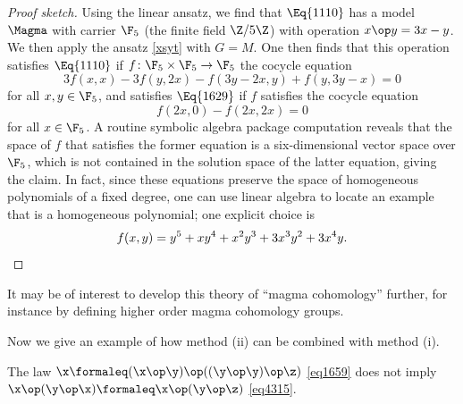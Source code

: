 \begin{proof}[Proof sketch] Using the linear ansatz, we find that $\Eq{1110}$ has a model $\Magma$ with carrier $\F_5$ (the finite field $\Z/5\Z$) with operation $x \op y = 3x-y$.  We then apply the ansatz \eqref{xsyt} with $G=M$.  One then finds that this operation satisfies $\Eq{1110}$ if $f \colon \F_5 \times \F_5 \to \F_5$  the cocycle equation
  $$3f(x,x) - 3f(y,2x) - f(3y-2x,y) + f(y,3y-x) = 0$$
for all $x,y \in \F_5$, and satisfies $\Eq{1629}$ if $f$ satisfies the cocycle equation
$$ f(2x,0) - f(2x,2x) = 0$$
for all $x \in \F_5$.  A routine symbolic algebra package computation reveals that the space of $f$ that satisfies the former equation is a six-dimensional vector space over $\F_5$, which is not contained in the solution space of the latter equation, giving the claim.
In fact, since these equations preserve the space of homogeneous polynomials of a fixed degree, one can use linear algebra to locate an example that is a homogeneous polynomial; one explicit choice is
\[
f(x,y) = y^5 +xy^4 + x^2y^3 +3x^3 y^2 + 3x^4 y. \qedhere
\]
\end{proof}

It may be of interest to develop this theory of ``magma cohomology'' further, for instance by defining higher order magma cohomology groups.

Now we give an example of how method (ii) can be combined with method (i).

\begin{proposition}[$\Eq{1659} \nmodels \Eq{4315}$]\label{1659-4315} The law $\x \formaleq (\x \op \y) \op ((\y \op \y) \op \z)$ \eqref{eq1659} does not imply $\x \op (\y \op \x) \formaleq \x \op (\y \op \z)$ \eqref{eq4315}.
\end{proposition}

